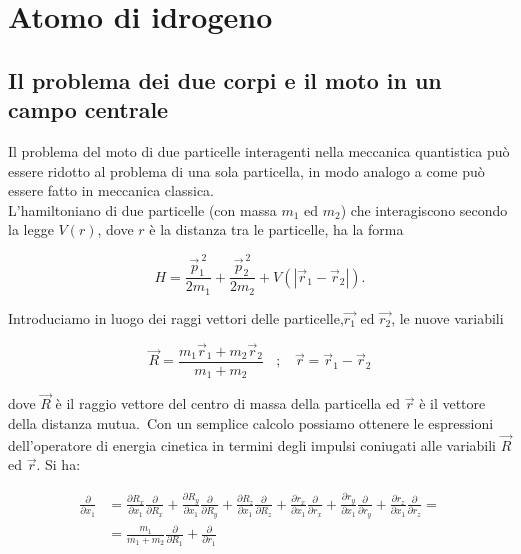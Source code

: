 \chapter{Atomo di idrogeno}
\section{Il problema dei due corpi e il moto in un campo centrale }
Il problema del moto di due particelle interagenti nella meccanica quantistica può essere ridotto al problema di una sola particella, in modo analogo a come può essere fatto in meccanica classica.\\
L'hamiltoniano di due particelle (con massa $m_1$ ed $m_2$) che interagiscono secondo la legge $V\left(r\right)$, dove $r$ è la distanza tra le particelle, ha la forma

\begin{equation}
H=\frac{\vec{p}_1^{\ 2}}{2m_1}+\frac{\vec{p}_2^{\ 2}}{2m_2}+V\left(|\vec{r}_1-\vec{r}_2|\right).
\end{equation} 

Introduciamo in luogo dei raggi vettori delle particelle,$\vec{r_1}$ ed $\vec{r_2}$, le nuove variabili

\begin{equation}
\vec{R}=\frac{m_1\vec{r}_1+m_2\vec{r}_2}{m_1+m_2} \ \ \ \ ;\ \ \ \ \vec{r}=\vec{r}_1-\vec{r}_2
\end{equation}

dove $\vec{R}$ è il raggio vettore del centro di massa della particella ed $\vec{r}$ è il vettore della distanza mutua.\
Con un semplice calcolo possiamo ottenere le espressioni dell'operatore di energia cinetica in termini degli impulsi coniugati alle variabili $\vec{R}$ ed $\vec{r}$. Si ha:

\begin{equation} 
\begin{split}
\frac{\partial}{\partial x_1} & = \frac{\partial R_x}{\partial x_1} \frac{\partial}{\partial R_x}+\frac{\partial R_y}{\partial x_1} \frac{\partial}{\partial R_y}+\frac{\partial R_z}{\partial x_1} \frac{\partial}{\partial R_z}+\frac{\partial r_x}{\partial x_1} \frac{\partial}{\partial r_x}+\frac{\partial r_y}{\partial x_1} \frac{\partial}{\partial r_y}+\frac{\partial r_z}{\partial x_1} \frac{\partial}{\partial r_z}= \\
 & = \frac{m_1}{m_1+m_2}\frac{\partial}{\partial R_1}+\frac{\partial}{\partial r_1}
\end{split}
\end{equation}

